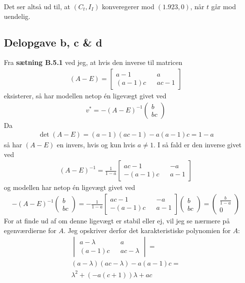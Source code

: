 \documentclass[12pt]{article}
\begin{document}
Det ser altså ud til, at $(C_t, I_I)$ konveregerer mod $(1.923, 0)$, når $t$ går mod uendelig.

\subsection{Delopgave b, c \& d}

Fra \textbf{sætning B.5.1} ved jeg, at hvis den inverse til matricen 
\begin{align}
(A-E) = \begin{bmatrix}
a-1 && a \\
(a-1)c && ac - 1
\end{bmatrix}
\end{align}
eksisterer, så har modellen netop én ligevægt givet ved
\begin{align}
v^* = 
-(A-E)^{-1}\begin{pmatrix}
b\\
bc
\end{pmatrix}
\end{align}
Da 
\begin{align}
\det (A - E) = (a-1)(ac-1) - a(a-1)c = 1-a
\end{align}
så har $(A-E)$ en invers, hvis og kun hvis $a\neq 1$. I så fald er den inverse givet ved
\begin{align}
(A-E)^{-1} = \frac{1}{1-a} \begin{bmatrix}
ac-1 && -a \\
-(a-1)c && a - 1
\end{bmatrix}
\end{align}
og modellen har netop én ligevægt givet ved
\begin{align}
-(A-E)^{-1}\begin{pmatrix}
b\\
bc
\end{pmatrix} = -\frac{1}{1-a} \begin{bmatrix}
ac-1 && -a \\
-(a-1)c && a - 1
\end{bmatrix}\begin{pmatrix}
b\\
bc
\end{pmatrix} =
\begin{pmatrix}
\frac{b}{1-a}\\
0
\end{pmatrix}
\end{align}
For at finde ud af om denne ligevægt er stabil eller ej, vil jeg se nærmere på egenværdierne for $A$. Jeg opskriver derfor det karakteristiske polynomien for $A$:
\begin{align}
\begin{vmatrix}
a - \lambda && a \\
(a-1)c && ac - \lambda
\end{vmatrix} = \\
(a-\lambda)(ac - \lambda) - a(a-1)c =\\ 
\lambda^2 + (-a(c+1))\lambda + ac
\end{align}
\end{document}
